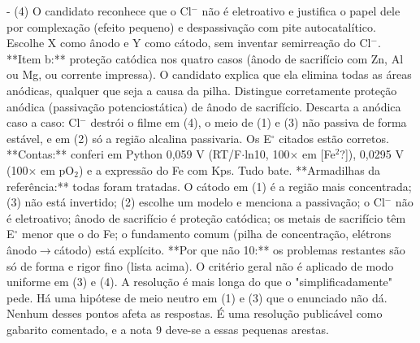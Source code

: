 \documentclass{article}%
\begin{document}
{-} (4) O candidato reconhece que o Cl$^{-}$ não é eletroativo e justifica o papel dele por complexação (efeito pequeno) e despassivação com pite autocatalítico. Escolhe X como ânodo e Y como cátodo, sem inventar semirreação do Cl$^{-}$.\newline%
\newline%
**Item b:** proteção catódica nos quatro casos (ânodo de sacrifício com Zn, Al ou Mg, ou corrente impressa). O candidato explica que ela elimina todas as áreas anódicas, qualquer que seja a causa da pilha. Distingue corretamente proteção anódica (passivação potenciostática) de ânodo de sacrifício. Descarta a anódica caso a caso: Cl$^{-}$ destrói o filme em (4), o meio de (1) e (3) não passiva de forma estável, e em (2) só a região alcalina passivaria. Os E$^\circ$ citados estão corretos.\newline%
\newline%
**Contas:** conferi em Python 0,059 V (RT/F$\cdot$ln10, 100$\times$ em {[}Fe$^2$?{]}), 0,0295 V (100$\times$ em pO$_{2}$) e a expressão do Fe com Kps. Tudo bate.\newline%
\newline%
**Armadilhas da referência:** todas foram tratadas. O cátodo em (1) é a região mais concentrada; (3) não está invertido; (2) escolhe um modelo e menciona a passivação; o Cl$^{-}$ não é eletroativo; ânodo de sacrifício é proteção catódica; os metais de sacrifício têm E$^\circ$ menor que o do Fe; o fundamento comum (pilha de concentração, elétrons ânodo$\to$cátodo) está explícito.\newline%
\newline%
**Por que não 10:** os problemas restantes são só de forma e rigor fino (lista acima). O critério geral não é aplicado de modo uniforme em (3) e (4). A resolução é mais longa do que o "simplificadamente" pede. Há uma hipótese de meio neutro em (1) e (3) que o enunciado não dá. Nenhum desses pontos afeta as respostas. É uma resolução publicável como gabarito comentado, e a nota 9 deve{-}se a essas pequenas arestas.%
\end{document}
